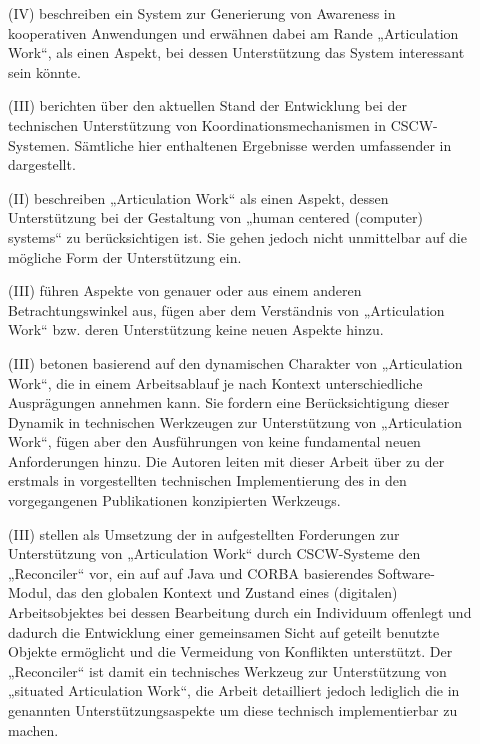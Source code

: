\begin{description}
	\item[\citet{Simone97}] (IV) beschreiben ein System zur Generierung von Awareness in kooperativen Anwendungen und erwähnen dabei am Rande „Articulation Work“, als einen Aspekt, bei dessen Unterstützung das System interessant sein könnte.
	\item[\citet{Simone97a}] (III) berichten über den aktuellen Stand der Entwicklung bei der technischen Unterstützung von Koordinationsmechanismen in CSCW-Systemen. Sämtliche hier enthaltenen Ergebnisse werden umfassender in \citep{Divitini00} dargestellt.
	\item[\citet{Kling98}] (II) beschreiben „Articulation Work“ als einen Aspekt, dessen Unterstützung bei der Gestaltung von „human centered (computer) systems“ zu berücksichtigen ist. Sie gehen jedoch nicht unmittelbar auf die mögliche Form der Unterstützung ein.
	\item[\citet{Carstensen99}] (III) führen Aspekte von \citep{Schmidt96} genauer oder aus einem anderen Betrachtungswinkel aus, fügen aber dem Verständnis von „Articulation Work“ bzw. deren Unterstützung keine neuen Aspekte hinzu.
	\item[\citet{Schmidt99}] (III) betonen basierend auf \citep{Schmidt96} den dynamischen Charakter von „Articulation Work“, die in einem Arbeitsablauf je nach Kontext unterschiedliche Ausprägungen annehmen kann. Sie fordern eine Berücksichtigung dieser Dynamik in technischen Werkzeugen zur Unterstützung von „Articulation Work“, fügen aber den Ausführungen von \citep{Schmidt96} keine fundamental neuen Anforderungen hinzu. Die Autoren leiten mit dieser Arbeit über zu der erstmals in \citet{Simone99} vorgestellten technischen Implementierung des in den vorgegangenen Publikationen konzipierten Werkzeugs.
	\item[\citet{Simone99}] (III) stellen als Umsetzung der in \citep{Schmidt96} aufgestellten Forderungen zur Unterstützung von „Articulation Work“ durch \gls{CSCW}-Systeme den „Reconciler“ vor, ein auf auf Java und \gls{CORBA} basierendes Software-Modul, das den globalen Kontext und Zustand eines (digitalen) Arbeitsobjektes bei dessen Bearbeitung durch ein Individuum offenlegt und dadurch die Entwicklung einer gemeinsamen Sicht auf geteilt benutzte Objekte ermöglicht und die Vermeidung von Konflikten unterstützt. Der „Reconciler“ ist damit ein technisches Werkzeug zur Unterstützung von „situated Articulation Work“, die Arbeit detailliert jedoch lediglich die in \citep{Schmidt96} genannten Unterstützungsaspekte um diese technisch implementierbar zu machen.

\end{description}

